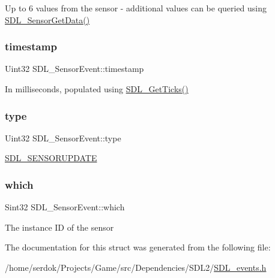Up to 6 values from the sensor -\/ additional values can be queried using \hyperlink{SDL__sensor_8h_a22466ee6b7af791937ebf1f7b76ed56b}{S\+D\+L\+\_\+\+Sensor\+Get\+Data()} \mbox{\label{structSDL__SensorEvent_a7de6c2b4d4791f5553b5de225293ceb5}} 
\subsubsection{\texorpdfstring{timestamp}{timestamp}}
{\footnotesize\ttfamily Uint32 S\+D\+L\+\_\+\+Sensor\+Event\+::timestamp}

In milliseconds, populated using \hyperlink{SDL__timer_8h_a0b9bc71d6287e0ffafdc3419760fe2b3}{S\+D\+L\+\_\+\+Get\+Ticks()} \mbox{\label{structSDL__SensorEvent_a0173d64fbe5299cad956298faf3fb0f9}} 
\subsubsection{\texorpdfstring{type}{type}}
{\footnotesize\ttfamily Uint32 S\+D\+L\+\_\+\+Sensor\+Event\+::type}

\hyperlink{SDL__events_8h_a3b589e89be6b35c02e0dd34a55f3fccaa1536ed6dfb1cdb20da84b7e2c602c022}{S\+D\+L\+\_\+\+S\+E\+N\+S\+O\+R\+U\+P\+D\+A\+TE} \mbox{\label{structSDL__SensorEvent_aa1c130192bad9b316f811f2d138b3b22}} 
\subsubsection{\texorpdfstring{which}{which}}
{\footnotesize\ttfamily Sint32 S\+D\+L\+\_\+\+Sensor\+Event\+::which}

The instance ID of the sensor 

The documentation for this struct was generated from the following file\+:\begin{DoxyCompactItemize}
\item 
/home/serdok/\+Projects/\+Game/src/\+Dependencies/\+S\+D\+L2/\hyperlink{SDL__events_8h}{S\+D\+L\+\_\+events.\+h}\end{DoxyCompactItemize}
